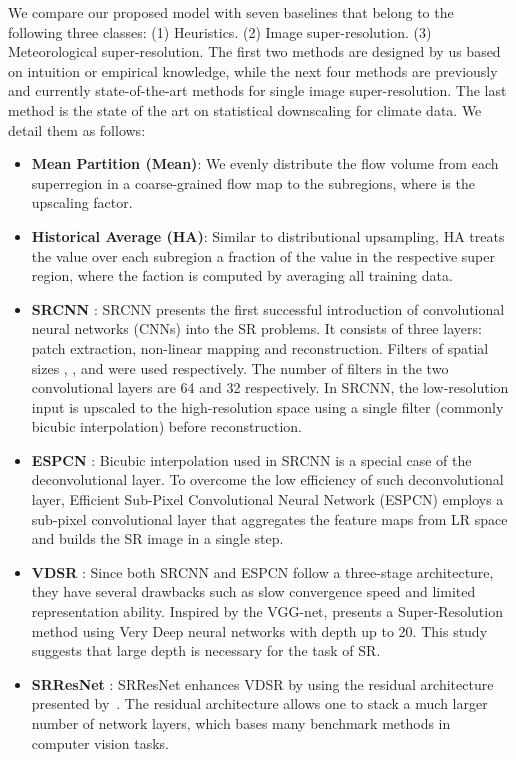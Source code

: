 We compare our proposed model with seven baselines that belong to the following three classes: (1) Heuristics. (2) Image super-resolution. (3) Meteorological super-resolution. The first two methods are designed by us based on intuition or empirical knowledge, while the next four methods are previously and currently state-of-the-art methods for single image super-resolution. The last method is the state of the art on statistical downscaling for climate data. We detail them as follows:

\begin{itemize}[leftmargin=*]
  \item \textbf{Mean Partition (Mean)}: We evenly distribute the flow volume from each superregion in a coarse-grained flow map to the  subregions, where  is the upscaling factor.
  \item \textbf{Historical Average (HA)}: Similar to distributional upsampling, HA treats the value over each subregion a fraction of the value in the respective super region, where the faction is computed by averaging all training data.
  \item \textbf{SRCNN} \cite{dong2016srcnn}: SRCNN presents the first successful introduction of convolutional neural networks (CNNs) into the SR problems. It consists of three layers: patch extraction, non-linear mapping and reconstruction. Filters of spatial sizes , , and  were used respectively. The number of filters in the two convolutional layers are 64 and 32 respectively. In SRCNN, the low-resolution input is upscaled to the high-resolution space using a single filter (commonly bicubic interpolation) before reconstruction.
  \item \textbf{ESPCN} \cite{shi2016espcn}: Bicubic interpolation used in SRCNN is a special case of the deconvolutional layer. To overcome the low efficiency of such deconvolutional layer, Efficient Sub-Pixel Convolutional Neural Network (ESPCN) employs a sub-pixel convolutional layer that aggregates the feature maps from LR space and builds the SR image in a single step.
  \item \textbf{VDSR} \cite{kim2016vdsr}: Since both SRCNN and ESPCN follow a three-stage architecture, they have several drawbacks such as slow convergence speed and limited representation ability. Inspired by the VGG-net, \citeauthor{kim2016vdsr} presents a Super-Resolution method using Very Deep neural networks with depth up to 20. This study suggests that large depth is necessary for the task of SR.
  \item \textbf{SRResNet} \cite{ledig2017srgan}: SRResNet enhances VDSR by using the residual architecture presented by~\citeauthor{he2016deep}\cite{he2016deep}. The residual architecture allows one to stack a much larger number of network layers, which bases many benchmark methods in computer vision tasks.

\end{itemize}
